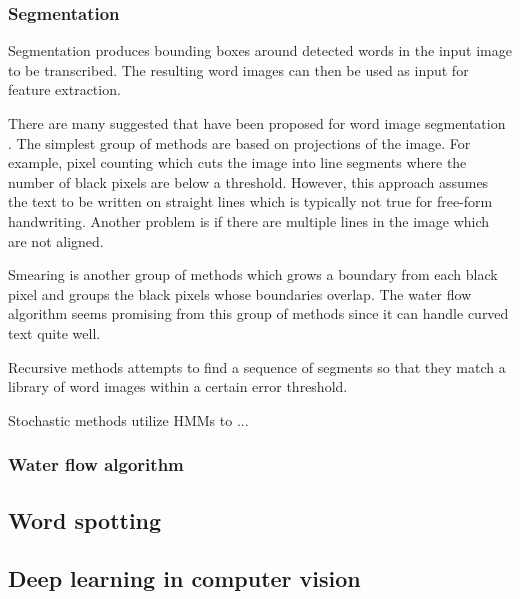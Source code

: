 \subsubsection{Segmentation}

Segmentation produces bounding boxes around detected words in the input image to be transcribed. The resulting word images can then be used as input for feature extraction.

There are many suggested that have been proposed for word image segmentation \cite{HWR_survey, Waterflow2011, Waterflow2015}. The simplest group of methods are based on projections of the image. For example, pixel counting which cuts the image into line segments where the number of black pixels are below a threshold. However, this approach assumes the text to be written on straight lines which is typically not true for free-form handwriting. Another problem is if there are multiple lines in the image which are not aligned.

Smearing is another group of methods which grows a boundary from each black pixel and groups the black pixels whose boundaries overlap. The water flow algorithm seems promising from this group of methods since it can handle curved text quite well.

Recursive methods attempts to find a sequence of segments so that they match a library of word images within a certain error threshold.

Stochastic methods utilize HMMs to ...


\subsubsection{Water flow algorithm}



\subsection{Word spotting}


\subsection{Deep learning in computer vision}

